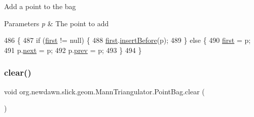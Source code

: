 Add a point to the bag


\begin{DoxyParams}{Parameters}
{\em p} & The point to add \\
\hline
\end{DoxyParams}

\begin{DoxyCode}
486                                  \{
487             \textcolor{keywordflow}{if} (\mbox{\hyperlink{classorg_1_1newdawn_1_1slick_1_1geom_1_1_mann_triangulator_1_1_point_bag_a120e5163711d94563be103af953fe059}{first}} != null) \{
488                 \mbox{\hyperlink{classorg_1_1newdawn_1_1slick_1_1geom_1_1_mann_triangulator_1_1_point_bag_a120e5163711d94563be103af953fe059}{first}}.\mbox{\hyperlink{classorg_1_1newdawn_1_1slick_1_1geom_1_1_mann_triangulator_1_1_point_afd6f758bff5fb93dc7ebc2921ce9ad95}{insertBefore}}(p);
489             \} \textcolor{keywordflow}{else} \{
490                 \mbox{\hyperlink{classorg_1_1newdawn_1_1slick_1_1geom_1_1_mann_triangulator_1_1_point_bag_a120e5163711d94563be103af953fe059}{first}} = p;
491                 p.\mbox{\hyperlink{classorg_1_1newdawn_1_1slick_1_1geom_1_1_mann_triangulator_1_1_point_a5679974de3d6ea0e554138b1d4e19123}{next}} = p;
492                 p.\mbox{\hyperlink{classorg_1_1newdawn_1_1slick_1_1geom_1_1_mann_triangulator_1_1_point_aada0547222c51b32a918839db2eca9f2}{prev}} = p;
493             \}
494         \}
\end{DoxyCode}
\mbox{\label{classorg_1_1newdawn_1_1slick_1_1geom_1_1_mann_triangulator_1_1_point_bag_a5c4e5b96ea8667ed723478412b412d3c}} 
\subsubsection{\texorpdfstring{clear()}{clear()}}
{\footnotesize\ttfamily void org.\+newdawn.\+slick.\+geom.\+Mann\+Triangulator.\+Point\+Bag.\+clear (\begin{DoxyParamCaption}{ }\end{DoxyParamCaption})\hspace{0.3cm}{\ttfamily [inline]}}

